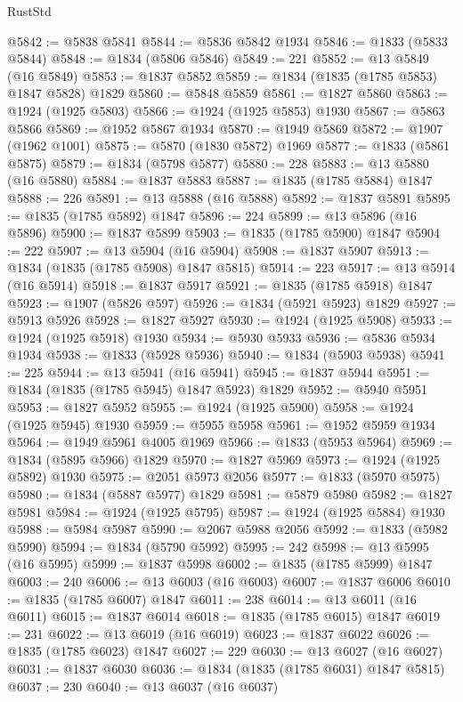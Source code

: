 \begin{lexlean}{RustStd}
\begin{coremodule}
@5842 := @5838 @5841
@5844 := @5836 @5842 @1934
@5846 := @1833 (@5833 @5844)
@5848 := @1834 (@5806 @5846)
@5849 := 221
@5852 := @13 @5849 (@16 @5849)
@5853 := @1837 @5852
@5859 := @1834 (@1835 (@1785 @5853) @1847 @5828) @1829
@5860 := @5848 @5859
@5861 := @1827 @5860
@5863 := @1924 (@1925 @5803)
@5866 := @1924 (@1925 @5853) @1930
@5867 := @5863 @5866
@5869 := @1952 @5867 @1934
@5870 := @1949 @5869
@5872 := @1907 (@1962 @1001)
@5875 := @5870 (@1830 @5872) @1969
@5877 := @1833 (@5861 @5875)
@5879 := @1834 (@5798 @5877)
@5880 := 228
@5883 := @13 @5880 (@16 @5880)
@5884 := @1837 @5883
@5887 := @1835 (@1785 @5884) @1847
@5888 := 226
@5891 := @13 @5888 (@16 @5888)
@5892 := @1837 @5891
@5895 := @1835 (@1785 @5892) @1847
@5896 := 224
@5899 := @13 @5896 (@16 @5896)
@5900 := @1837 @5899
@5903 := @1835 (@1785 @5900) @1847
@5904 := 222
@5907 := @13 @5904 (@16 @5904)
@5908 := @1837 @5907
@5913 := @1834 (@1835 (@1785 @5908) @1847 @5815)
@5914 := 223
@5917 := @13 @5914 (@16 @5914)
@5918 := @1837 @5917
@5921 := @1835 (@1785 @5918) @1847
@5923 := @1907 (@5826 @597)
@5926 := @1834 (@5921 @5923) @1829
@5927 := @5913 @5926
@5928 := @1827 @5927
@5930 := @1924 (@1925 @5908)
@5933 := @1924 (@1925 @5918) @1930
@5934 := @5930 @5933
@5936 := @5836 @5934 @1934
@5938 := @1833 (@5928 @5936)
@5940 := @1834 (@5903 @5938)
@5941 := 225
@5944 := @13 @5941 (@16 @5941)
@5945 := @1837 @5944
@5951 := @1834 (@1835 (@1785 @5945) @1847 @5923) @1829
@5952 := @5940 @5951
@5953 := @1827 @5952
@5955 := @1924 (@1925 @5900)
@5958 := @1924 (@1925 @5945) @1930
@5959 := @5955 @5958
@5961 := @1952 @5959 @1934
@5964 := @1949 @5961 @4005 @1969
@5966 := @1833 (@5953 @5964)
@5969 := @1834 (@5895 @5966) @1829
@5970 := @1827 @5969
@5973 := @1924 (@1925 @5892) @1930
@5975 := @2051 @5973 @2056
@5977 := @1833 (@5970 @5975)
@5980 := @1834 (@5887 @5977) @1829
@5981 := @5879 @5980
@5982 := @1827 @5981
@5984 := @1924 (@1925 @5795)
@5987 := @1924 (@1925 @5884) @1930
@5988 := @5984 @5987
@5990 := @2067 @5988 @2056
@5992 := @1833 (@5982 @5990)
@5994 := @1834 (@5790 @5992)
@5995 := 242
@5998 := @13 @5995 (@16 @5995)
@5999 := @1837 @5998
@6002 := @1835 (@1785 @5999) @1847
@6003 := 240
@6006 := @13 @6003 (@16 @6003)
@6007 := @1837 @6006
@6010 := @1835 (@1785 @6007) @1847
@6011 := 238
@6014 := @13 @6011 (@16 @6011)
@6015 := @1837 @6014
@6018 := @1835 (@1785 @6015) @1847
@6019 := 231
@6022 := @13 @6019 (@16 @6019)
@6023 := @1837 @6022
@6026 := @1835 (@1785 @6023) @1847
@6027 := 229
@6030 := @13 @6027 (@16 @6027)
@6031 := @1837 @6030
@6036 := @1834 (@1835 (@1785 @6031) @1847 @5815)
@6037 := 230
@6040 := @13 @6037 (@16 @6037)

\end{coremodule}
\end{lexlean}
